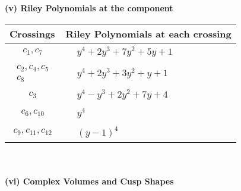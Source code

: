 \documentclass[1p]{elsarticle_modified}
\theoremstyle{definition}
\begin{document}
\newpage\renewcommand{\arraystretch}{1}
\flushleft \textbf{(v) Riley Polynomials at the component}\newline \\
\begin{tabular}{m{50pt}|m{274pt}}
Crossings & \hspace{64pt}Riley Polynomials at each crossing \\
\hline $$\begin{aligned}c_{1},c_{7}\end{aligned}$$&$\begin{aligned}
&y^4+2 y^3+7 y^2+5 y+1
\end{aligned}$\\
\hline $$\begin{aligned}c_{2},c_{4},c_{5}\\c_{8}\end{aligned}$$&$\begin{aligned}
&y^4+2 y^3+3 y^2+y+1
\end{aligned}$\\
\hline $$\begin{aligned}c_{3}\end{aligned}$$&$\begin{aligned}
&y^4- y^3+2 y^2+7 y+4
\end{aligned}$\\
\hline $$\begin{aligned}c_{6},c_{10}\end{aligned}$$&$\begin{aligned}
&y^4
\end{aligned}$\\
\hline $$\begin{aligned}c_{9},c_{11},c_{12}\end{aligned}$$&$\begin{aligned}
&(y-1)^4
\end{aligned}$\\
\hline
\end{tabular}\\~\\
\newpage\flushleft \textbf{(vi) Complex Volumes and Cusp Shapes}
\end{document}
